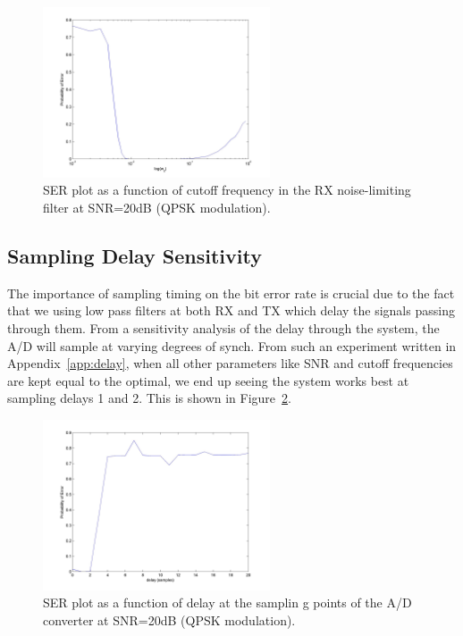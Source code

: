 \documentclass[]{article}
\begin{document}
\begin{figure}[H]
\centering
\includegraphics[width=0.6\textwidth]{freqRX.jpg}
\caption{SER plot as a function of cutoff frequency in the RX noise-limiting filter at SNR=20dB (QPSK modulation). \label{fig:freqRX}}
\end{figure}

\subsection{Sampling Delay Sensitivity}

The importance of sampling timing on the bit error rate is crucial due to the fact that we using low pass filters at both RX and TX  which delay the signals passing through them. From a sensitivity analysis of the delay through the system, the A/D will sample at varying degrees of synch. From such an experiment written in Appendix~\ref{app:delay}, when all other parameters like SNR and cutoff frequencies are kept equal to the optimal, we end up seeing the system works best at sampling delays 1 and 2. This is shown in Figure~\ref{fig:delay}.

\begin{figure}[H]
\centering
\includegraphics[width=0.6\textwidth]{delaySensitivity.jpg}
\caption{SER plot as a function of delay at the samplin g points of the A/D converter at SNR=20dB (QPSK modulation). \label{fig:delay}}
\end{figure}
\end{document}
